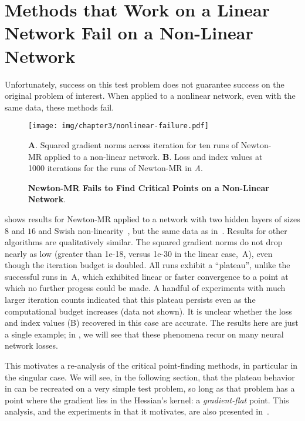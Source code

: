 \documentclass[../../thesis.tex]{subfiles}
\begin{document}
\section{Methods that Work on a Linear Network Fail on a Non-Linear Network}%

Unfortunately,
success on this test problem does not guarantee
success on the original problem of interest.
When applied to a nonlinear network,
even with the same data,
these methods fail.

\begin{figure}[h]
	\begin{center}
		\texttt{[image: img/chapter3/nonlinear-failure.pdf]}
	\end{center}
	\caption{\textbf{Newton-MR Fails to Find Critical Points
	on a Non-Linear Network}.}
	\textbf{A}. Squared gradient norms across iteration
	for ten runs of Newton-MR applied to a non-linear network.
	\textbf{B}. Loss and index values at 1000 iterations
	for the runs of Newton-MR in \emph{A}.
\end{figure}

 shows
results for Newton-MR applied to
a network with two hidden layers of sizes $8$ and $16$
and Swish non-linearity~\cite{ramachandran2017},
but the same data as in~.
Results for other algorithms are qualitatively similar.
The squared gradient norms do not drop nearly as low
(greater than 1e-18, versus 1e-30
in the linear case,~A),
even though the iteration budget is doubled.
All runs exhibit a \enquote{plateau},
unlike the successful runs
in~A,
which exhibited linear or faster convergence
to a point at which no further progess could be made.
A handful of experiments with much larger iteration counts
indicated that this plateau persists even as the computational budget increases
(data not shown).
It is unclear whether the loss and index values
(B)
recovered in this case are accurate.
The results here are just a single example;
in ,
we will see that these phenomena recur on many neural network losses.

This motivates a re-analysis of the critical point-finding methods,
in particular in the singular case.
We will see, in the following section,
that the plateau behavior in 
can be recreated on a very simple test problem,
so long as that problem has a point where
the gradient lies in the Hessian's kernel:
a \emph{gradient-flat} point.
This analysis, and the experiments in
 that it motivates,
are also presented in~\cite{frye2020}.
\end{document}

